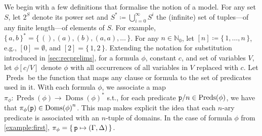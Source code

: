 \documentclass{article}
\newcommand{\predicate}{\texttt{\textup{p}}}
\DeclareMathOperator{\Doms}{Doms}
\DeclareMathOperator{\Preds}{Preds}
\begin{document}
We begin with a few definitions that formalise the notion of a model. For any
set $S$, let $2^{S}$ denote its power set and
$S^{\ast} \coloneqq \bigcup_{i=0}^{\infty} S^{i}$ the (infinite) set of
tuples---of any finite length---of elements of $S$. For example,
${\{\,a, b\,\}}^{\ast} = \{\, (), (a), (b), (a, a), \dots \,\}$. For any
$n \in \mathbb{N}_{0}$, let $[n] \coloneqq \{\, 1, \dots, n \,\}$, e.g.,
$[0] = \emptyset$, and $[2] = \{\, 1, 2 \,\}$. Extending the notation for
substitution introduced in \cref{sec:recprelims}, for a formula $\phi$, constant
$c$, and set of variables $V$, let $\phi[c/V]$ denote $\phi$ with all
occurrences of all variables in $V$ replaced with $c$. Let $\Preds$ be the
function that maps any clause or formula to the set of predicates used in it.
With each formula $\phi$, we associate a map
$\pi_{\phi}\colon \Preds(\phi) \to {\Doms(\phi)}^{\ast}$ s.t., for each
predicate $\predicate/n \in \Preds(\phi)$, we have that
$\pi_{\phi}(\predicate) \in {\Doms(\phi)}^{n}$. This map makes explicit the idea
that each $n$-ary predicate is associated with an $n$-tuple of domains. In the
case of formula $\phi$ from \cref{example:first},
$\pi_{\phi} = \{\, \predicate \mapsto (\Gamma, \Delta) \,\}$.
\end{document}
